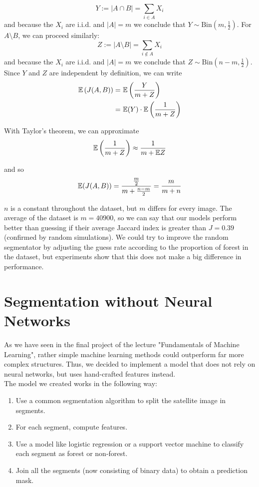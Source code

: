 \begin{equation}
  Y:= |A \cap B| = \sum_{i \in A} X_i
\end{equation}
and because the $X_i$ are i.i.d. and $|A|=m$ we conclude that $Y\sim \text{Bin}(m, \frac{1}{2})$. For $A\setminus B$, we can proceed similarly:
\begin{equation}
  Z:= |A\setminus B| = \sum_{i \notin A} X_i
\end{equation}
and because the $X_i$ are i.i.d. and $|A|=m$ we conclude that $Z\sim \text{Bin}\left (n-m, \frac{1}{2} \right)$. Since $Y$ and $Z$ are independent by definition, we can write
\begin{align*}
  \mathbb{E}\left(J(A,B)\right) = \ & \mathbb{E} \left(\frac{Y}{m+Z} \right) \\
   = \ & \mathbb{E}(Y) \cdot \mathbb{E} \left(\frac{1}{m+Z} \right)
\end{align*}

With Taylor's theorem, we can approximate
\begin{equation}
  \mathbb{E} \left(\frac{1}{m+Z}\right) \approx \frac{1}{m+\mathbb{E} Z}
\end{equation}

and so
\begin{equation}
  \mathbb{E}(J(A,B)) = \frac{\frac{m}{2}}{m + \frac{n-m}{2}} = \frac{m}{m+n}
\end{equation}

$n$ is a constant throughout the dataset, but $m$ differs for every image. The average of the dataset is $m=40900$, so we can say that our models perform better than guessing if their average Jaccard index is greater than $J = 0.39$ (confirmed by random simulations). We could try to improve the random segmentator by adjusting the guess rate according to the proportion of forest in the dataset, but experiments show that this does not make a big difference in performance.

\section{Segmentation without Neural Networks}
As we have seen in the final project of the lecture "Fundamentals of Machine Learning", rather simple machine learning methods could outperform far more complex structures. Thus, we decided to implement a model that does not rely on neural networks, but uses hand-crafted features instead. \\
The model we created works in the following way:
\begin{enumerate}
	\item Use a common segmentation algorithm to split the satellite image in segments.
	\item For each segment, compute features.
	\item Use a model like logistic regression or a support vector machine to classify each segment as forest or non-forest.
	\item Join all the segments (now consisting of binary data) to obtain a prediction mask.
\end{enumerate}

